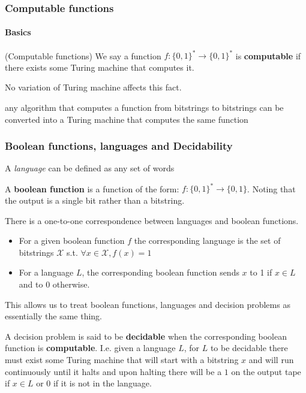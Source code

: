 \documentclass{beamer}
\begin{document}
\begin{frame}
  \frametitle{Computable functions}
  \framesubtitle{Basics}

  \begin{definition}(Computable functions)
    We say a function $f : \{ 0,1 \} ^{*} \rightarrow \{ 0,1 \} ^{*}$ is \textbf{computable} if there exists some Turing machine that computes it.
  \end{definition}

  No variation of Turing machine affects this fact.

  \begin{thesis}
    any algorithm that computes a function from bitstrings to bitstrings can be converted into a Turing machine that computes the same function
  \end{thesis}
\end{frame}

\begin{frame}[allowframebreaks]
  \frametitle{Boolean functions, languages and Decidability}

  \begin{definition}[Language]
    A \textit{language} can be defined as any set of words
  \end{definition}

  \begin{definition}
    A \textbf{boolean function} is a function of the form: $f : \{ 0,1 \}^{*} \rightarrow \{ 0,1 \} $. Noting that the output is a single bit rather than a bitstring.
  \end{definition}

  \color{red} There is a one-to-one correspondence between languages and boolean functions.\color{black}
\begin{itemize}
  \item For a given boolean function $f$ the corresponding language is the set of bitstrings $\mathcal{X}$ s.t. $\forall x\in \mathcal{X}, f(x) = 1$
  \item For a language $L$, the corresponding boolean function sends $x$ to 1 if $x \in L$ and to $0$ otherwise.
\end{itemize}

This allows us to treat boolean functions, languages and decision problems as essentially the same thing.

A decision problem is said to be \textbf{decidable} when the corresponding boolean function is \textbf{computable}. I.e. given a language $L$, for $L$ to be decidable there must exist some Turing machine that will start with a bitstring $x$ and will run continuously until it halts and upon halting there will be a $1$ on the output tape if $x \in L$ or $0$ if it is not in the language.
\end{frame}
\end{document}
